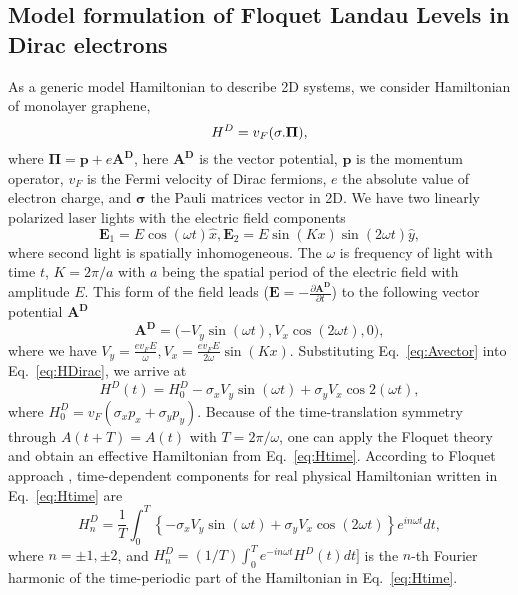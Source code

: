 \documentclass[aps,pra,preprint,showpacs]{revtex4-1}
\begin{document}
\subsection{Model formulation of Floquet Landau Levels in Dirac electrons}
As a generic model Hamiltonian to describe 2D systems, we consider Hamiltonian of monolayer graphene,
\begin{equation} \label{eq:HDirac}
	H^D=v_F(\bf{\sigma . \Pi}), 
\end{equation}%
where $\mathbf{\Pi =p+}e\mathbf{A^D}$, here $\mathbf{A^D}$ is the vector potential, $\mathbf{p}$ is the momentum operator, $v_F$ is the Fermi
velocity of Dirac fermions, $e$ the absolute value of electron charge, and $\mathbf{\sigma}$ the Pauli matrices vector in 2D. We have two linearly polarized laser lights with the electric field components
\begin{equation} \label{eq:Efield}
	\mathbf{E}_{1} =E\cos (\omega t)\hat{x},\mathbf{E}_{2}=E\sin
	(Kx)\sin (2\omega t)\hat{y},
\end{equation}%
where second light is spatially inhomogeneous. The $\omega $ is frequency of light with time $t$, $%
K=2\pi /a$ with $a$ being the spatial period of the electric field with
amplitude $E$. This form of the field leads ($\mathbf{E}=-\frac{\partial \mathbf{A^D}}{\partial t}$) to the following vector potential $\mathbf{A^D}$
\begin{equation} \label{eq:Avector}
	\mathbf{A^D=(- }V_y\sin (\omega t), V_x \cos (2\omega t),0\mathbf{),} 
\end{equation}%
where we have $V_{y}=\frac{ev_FE}{\omega },V_{x}=\frac{ev_FE}{2\omega }\sin(Kx)$. Substituting Eq.~\eqref{eq:Avector} into Eq.~\eqref{eq:HDirac}, we arrive at
\begin{equation} \label{eq:Htime}
	H^D(t)=H_{0}^D- \sigma _{x}V_{y}\sin (\omega t)+\sigma _{y}V_{x}\cos 2(\omega
	t),
\end{equation}%
where $H_{0}^D=v_F(\sigma _{x} p_{x}+\sigma_{y} p_{y})$. Because of the time-translation symmetry through $A(t+T)=A(t)$ with $T=2\pi /\omega $, one can apply the Floquet theory \cite{AEE, MBL} and obtain an effective Hamiltonian from Eq.~\eqref{eq:Htime}. According to Floquet approach \cite{JHS,HSA,MGP,MBL,AEE,NGJ}, time-dependent components for real physical Hamiltonian written in Eq.~\eqref{eq:Htime} are
\begin{equation} \label{eq:Htimen}
	H_{n}^D  =\frac{1}{T}\int_{0}^{T}\left\{-\sigma_{x}V_y\sin(\omega
	t)+\sigma_{y}V_x\cos(2\omega t)\right\}  e^{in\omega t}dt,
\end{equation}
where $n=\pm 1, \pm 2$, and $H_{n}^D=(1/T)\int_{0}^{T}e^{-in\omega t}H^D(t)dt]$ is the $n$-th Fourier harmonic of the time-periodic part of the Hamiltonian in Eq.~\eqref{eq:Htime}.
\end{document}
